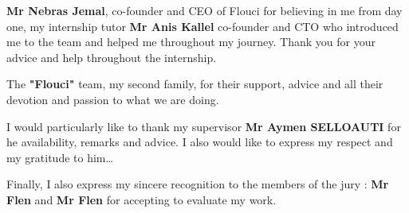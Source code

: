 \textbf{Mr Nebras Jemal}, co-founder and CEO of Flouci for believing in me from day one, my internship tutor \textbf{Mr Anis Kallel} co-founder and CTO who introduced me to the team and helped me throughout my journey. Thank you for your advice and help throughout the internship. \newline

The \textbf{"Flouci"} team, my second family, for their support, advice and all their devotion and passion to what we are doing.\newline

I would particularly like to thank my supervisor \textbf{Mr Aymen SELLOAUTI} for he availability, remarks and advice. I also would like to express my respect and my gratitude to him\dots\newline

Finally, I also express my sincere recognition to the members of the jury : \textbf{Mr Flen} and \textbf{Mr Flen} for accepting to evaluate my work.